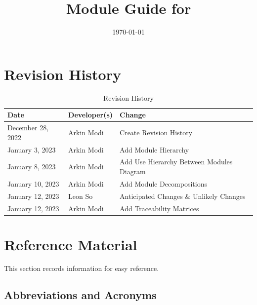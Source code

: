 \documentclass[12pt, titlepage]{article}
\begin{document}
\title{Module Guide for \progname{}}
\author{\authname}
\date{\today}

\maketitle


\section{Revision History}

\begin{table}[hp]
	\caption{Revision History} \label{TblRevisionHistory}
	\begin{tabularx}{\textwidth}{llX}
		\toprule
		\textbf{Date}     & \textbf{Developer(s)} & \textbf{Change}                           \\
		\midrule
		December 28, 2022 & Arkin Modi            & Create Revision History                   \\
		January 3, 2023   & Arkin Modi            & Add Module Hierarchy                      \\
		January 8, 2023   & Arkin Modi            & Add Use Hierarchy Between Modules Diagram \\
		January 10, 2023  & Arkin Modi            & Add Module Decompositions                 \\
		January 12, 2023  & Leon So               & Anticipated Changes \& Unlikely Changes   \\
		January 12, 2023  & Arkin Modi            & Add Traceability Matrices                 \\
		\bottomrule
	\end{tabularx}
\end{table}

\newpage

\section{Reference Material}

This section records information for easy reference.

\subsection{Abbreviations and Acronyms}
\end{document}
